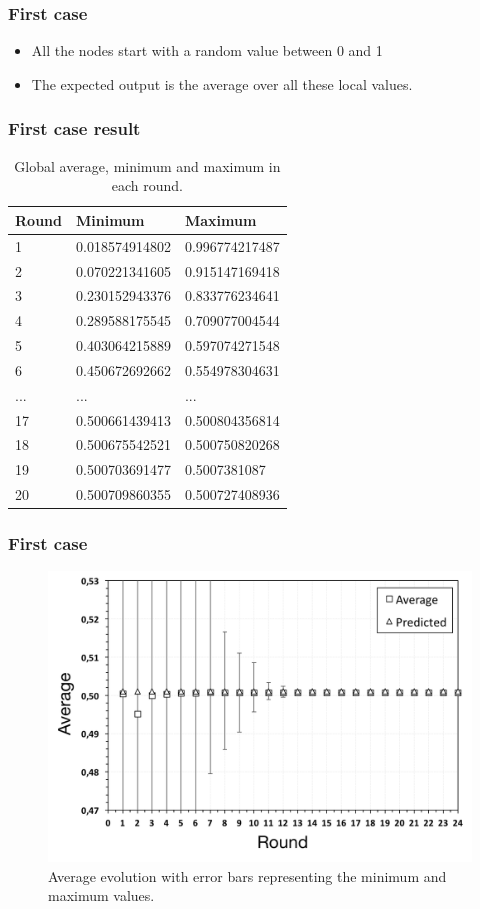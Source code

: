 \documentclass{beamer}
\begin{document}
\begin{frame}
\frametitle{First case}

\begin{itemize}
  \item All the nodes start with a random value between 0 and 1
  \item The expected output is the average over all these local values.
\end{itemize}
\end{frame}


\begin{frame}
\frametitle{First case result}
\begin{table}
\begin{tabular}{l l l}
\toprule
\textbf{Round} & \textbf{Minimum} & \textbf{Maximum}\\
\midrule
1 & 0.018574914802 & 0.996774217487 \\
2 & 0.070221341605 & 0.915147169418 \\
3 & 0.230152943376 & 0.833776234641 \\
4 & 0.289588175545 & 0.709077004544 \\
5 & 0.403064215889 & 0.597074271548 \\
6 & 0.450672692662 & 0.554978304631 \\
... & ... & ... \\
17  & 0.500661439413 & 0.500804356814 \\
18  & 0.500675542521 & 0.500750820268 \\
19  & 0.500703691477 & 0.5007381087 \\
20  & 0.500709860355 & 0.500727408936 \\
\bottomrule
\end{tabular}
\caption{Global average, minimum and maximum in each round.}
\end{table}
\end{frame}

\begin{frame}
\frametitle{First case}
    
\begin{figure}[p]
\centering
\includegraphics[keepaspectratio=true, width=0.8\linewidth]{images/aggregation_average}
\caption{Average evolution with error bars representing the minimum and maximum values.}
\label{fig:aggregation_average}
\end{figure}
\end{frame}
\end{document}
